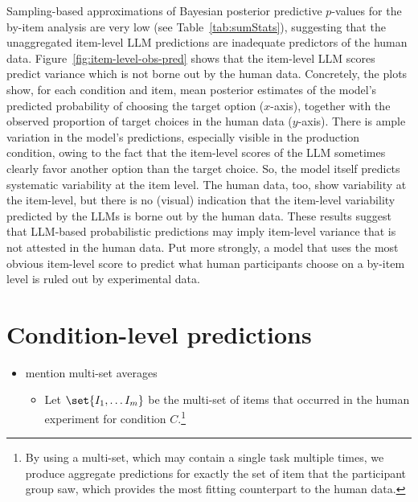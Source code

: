 \documentclass[fleqn]{article}
\begin{document}
Sampling-based approximations of Bayesian posterior predictive $p$-values for the by-item analysis are very low (see Table~\ref{tab:sumStats}), suggesting that the unaggregated item-level LLM predictions are inadequate predictors of the human data.
Figure~\ref{fig:item-level-obs-pred} shows that the item-level LLM scores predict variance which is not borne out by the human data.
Concretely, the plots show, for each condition and item, mean posterior estimates of the model's predicted probability of choosing the target option ($x$-axis), together with the observed proportion of target choices in the human data ($y$-axis).
There is ample variation in the model's predictions, especially visible in the production condition, owing to the fact that the item-level scores of the LLM sometimes clearly favor another option than the target choice.
So, the model itself predicts systematic variability at the item level.
The human data, too, show variability at the item-level, but there is no (visual) indication that the item-level variability predicted by the LLMs is borne out by the human data.
These results suggest that LLM-based probabilistic predictions may imply item-level variance that is not attested in the human data.
Put more strongly, a model that uses the most obvious item-level score to predict what human participants choose on a by-item level is ruled out by experimental data.



\section{Condition-level predictions}
\label{llm-predictions-for-reference-games}


\begin{itemize}
  \item mention multi-set averages
  \begin{itemize}
    \item Let \(\set{I_1, \dots I_m}\) be the multi-set of items that occurred in the human experiment for condition $C$.\footnote{
  By using a multi-set, which may contain a single task multiple times, we produce aggregate predictions for exactly the set of item that the participant group saw, which provides the most fitting counterpart to the human data.
}

  \end{itemize}
\end{itemize}
\end{document}
